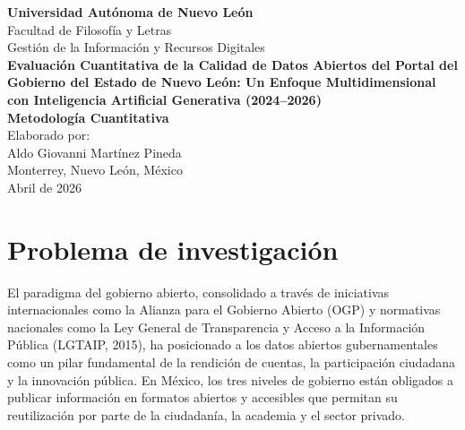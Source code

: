 \documentclass[12pt,letterpaper]{article}
\begin{document}
\begin{titlepage}
\centering
\vspace*{2cm}

{\Large\bfseries Universidad Autónoma de Nuevo León}\\[0.3cm]
{\large Facultad de Filosofía y Letras}\\[0.3cm]
{\large Gestión de la Información y Recursos Digitales}\\[2cm]

{\LARGE\bfseries Evaluación Cuantitativa de la Calidad de Datos Abiertos del Portal del Gobierno del Estado de Nuevo León: Un Enfoque Multidimensional con Inteligencia Artificial Generativa (2024--2026)}\\[2cm]

{\large\bfseries Metodología Cuantitativa}\\[1.5cm]

{\large Elaborado por:}\\[0.3cm]
{\large Aldo Giovanni Martínez Pineda}\\[1.5cm]

{\large Monterrey, Nuevo León, México}\\[0.3cm]
{\large Abril de 2026}

\vfill
\end{titlepage}

\tableofcontents
\newpage

\section{Problema de investigación}

El paradigma del gobierno abierto, consolidado a través de iniciativas internacionales como la Alianza para el Gobierno Abierto (OGP) y normativas nacionales como la Ley General de Transparencia y Acceso a la Información Pública (LGTAIP, 2015), ha posicionado a los datos abiertos gubernamentales como un pilar fundamental de la rendición de cuentas, la participación ciudadana y la innovación pública. En México, los tres niveles de gobierno están obligados a publicar información en formatos abiertos y accesibles que permitan su reutilización por parte de la ciudadanía, la academia y el sector privado.
\end{document}
